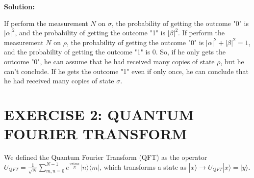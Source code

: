 \documentclass[12pt]{article}
\begin{document}
\begin{enumerate}[start=4]
          \textbf{Solution:}


          If perform the measurement $N$ on $\sigma$, the probability of getting the outcome "0" is $|\alpha|^2$, and the probability of getting the outcome "1" is $|\beta|^2$. If perform the measurement $N$ on $\rho$, the probability of getting the outcome "0" is $|\alpha|^2+|\beta|^2=1$, and the probability of getting the outcome "1" is 0. So, if he only gets the outcome "0", he can assume that he had received many copies of state $\rho$, but he can't conclude. If he gets the outcome "1" even if only once, he can conclude that he had received many copies of state $\sigma$.



\end{enumerate}

\section{EXERCISE 2: QUANTUM FOURIER TRANSFORM}

We defined the Quantum Fourier Transform (QFT) as the operator $U_{QFT} = \frac{1}{\sqrt{N}} \sum_{m,n=0}^{N-1} e^{\frac{2\pi i mn}{N}} |n\rangle\langle m|$, which transforms a state as $|x\rangle \rightarrow U_{QFT}|x\rangle = |y\rangle$.
\end{document}
